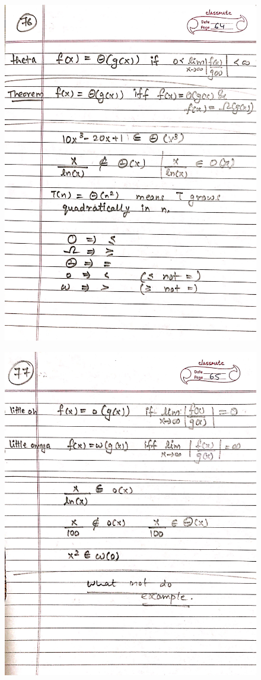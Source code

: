 \begin{figure}[H]
    \centering
    \includegraphics[scale=0.25]{"./MIT-6.042J/MIT-6042J-076"}
\end{figure}
\newpage
\begin{figure}[H]
    \centering
    \includegraphics[scale=0.25]{"./MIT-6.042J/MIT-6042J-077"}
\end{figure}
